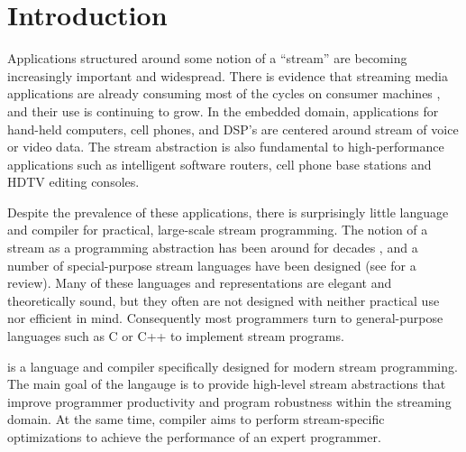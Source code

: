 \section{Introduction}

Applications structured around some notion of a ``stream'' are
becoming increasingly important and widespread. There is evidence
that streaming media applications are already consuming most of
the cycles on consumer machines \cite{Rix98}, and their use is
continuing to grow.  In the embedded domain, applications for
hand-held computers, cell phones, and DSP's are centered around
stream of voice or video data.  The stream abstraction is also
fundamental to high-performance applications such as intelligent
software routers, cell phone base stations and HDTV editing
consoles.

Despite the prevalence of these applications, there is
surprisingly little language and compiler for practical,
large-scale stream programming.  The notion of a stream as a
programming abstraction has been around for decades \cite{SICP},
and a number of special-purpose stream languages have been
designed (see \cite{survey97} for a review). Many of these
languages and representations are elegant and theoretically sound,
but they often are not designed with neither practical use nor
efficient in mind. Consequently most programmers turn to
general-purpose languages such as C or C++ to implement stream
programs.

\begin{comment}
There are two reasons that general-purpose languages are
inappropriate for stream programming.  Firstly, they are a
mismatch for the application domain.  That is they do not provide
a natural or intuitive representation of streams thereby having a
negative effect on readability, robustness, and programmer
productivity.  Furthermore, general-purpose languages do not
communicate well the inherent parallelism of stream computations.
 Secondly, general-purpose languages are a mismatch for the
emerging class of grid-based architectures
\cite{smartmemories,rawshort,trips}.
\end{comment}

{\StreamIt} is a language and compiler specifically designed for
modern stream programming.  The main goal of the {\StreamIt}
langauge is to provide high-level stream abstractions that improve
programmer productivity and program robustness within the
streaming domain.  At the same time, {\StreamIt} compiler aims to
perform stream-specific optimizations to achieve the performance
of an expert programmer.

